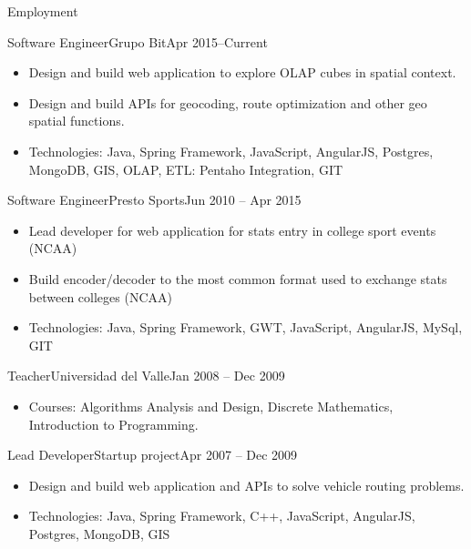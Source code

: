 \documentclass[]{mcdowellcv}
\begin{document}
	\makeheader
	
	\begin{cvsection}{Employment}
		\begin{cvsubsection}{Software Engineer}{Grupo Bit}{Apr 2015--Current}
			\begin{itemize}
				\item Design and build web application to explore OLAP cubes in spatial context.
				\item Design and build APIs for geocoding, route optimization and other geo spatial functions.
				\item Technologies: Java, Spring Framework, JavaScript, AngularJS, Postgres, MongoDB, GIS, OLAP, ETL: Pentaho Integration, GIT 		 			
			\end{itemize}
		\end{cvsubsection}
		
		\begin{cvsubsection}{Software Engineer}{Presto Sports}{Jun 2010 -- Apr 2015}						
			\begin{itemize}
				\item Lead developer for web application for stats entry in college sport events (NCAA)
				\item Build encoder/decoder to the most common format used to exchange stats between colleges (NCAA)
				\item Technologies: Java, Spring Framework, GWT, JavaScript, AngularJS, MySql, GIT	
				
			\end{itemize}
		\end{cvsubsection}
%		
%		
		\begin{cvsubsection}{Teacher}{Universidad del Valle}{Jan 2008 -- Dec 2009}		
			\begin{itemize}
				\item Courses: Algorithms Analysis and Design, Discrete Mathematics, Introduction to Programming.			
			\end{itemize}
		\end{cvsubsection}
		
		\begin{cvsubsection}{Lead Developer}{Startup project}{Apr 2007 -- Dec 2009}		
			\begin{itemize}
				\item Design and build web application and APIs to solve vehicle routing problems.
				\item Technologies: Java, Spring Framework, C++, JavaScript, AngularJS, Postgres, MongoDB, GIS 	
			\end{itemize}
		\end{cvsubsection}
		

\end{cvsection}
\end{document}

